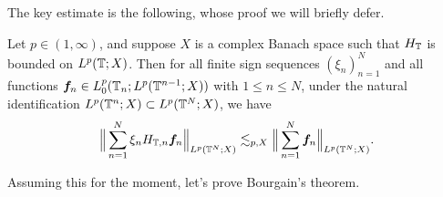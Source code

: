 The key estimate is the following, whose proof we will briefly defer.
\begin{prop}\label{prop:Bourgain-H}
  Let $p \in (1,\infty)$, and suppose $X$ is a complex Banach space such that $H_{\mathbb{T}}$ is bounded on $L^p(\mathbb{T};X)$.
  Then for all finite sign sequences $(\xi_{n})_{n=1}^{N}$ and all functions $\bm{f}_{n} \in L^p_{0}(\mathbb{T}_{n};L^p(\mathbb{T}^{n-1};X))$ with $1 \leq n \leq N$, under the natural identification $L^p(\mathbb{T}^{n};X) \subset L^p(\mathbb{T}^{N};X)$, we have
  \begin{equation*}
    \Big\| \sum_{n=1}^{N} \xi_{n} H_{\mathbb{T},n} \bm{f}_{n} \Big\|_{L^p(\mathbb{T}^{N};X)} \lesssim_{p,X} \Big\| \sum_{n=1}^{N} \bm{f}_{n} \Big\|_{L^p(\mathbb{T}^{N};X)}.
  \end{equation*}
\end{prop}

Assuming this for the moment, let's prove Bourgain's theorem.
